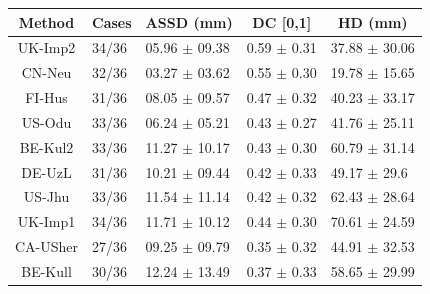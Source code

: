 \documentclass[11pt]{article}
\begin{document}
\begin{table}[]
	\label{siss results}
	\centering
	\begin{tabular}{cllll}
		\textbf{Method} & \multicolumn{1}{c}{\textbf{Cases}} & \multicolumn{1}{c}{\textbf{ASSD (mm)}} & \multicolumn{1}{c}{\textbf{DC {[}0,1{]}}} & \multicolumn{1}{c}{\textbf{HD (mm)}} \\ \hline
		UK-Imp2         & 34/36                              & 05.96 $\pm$ 09.38                         & 0.59 $\pm$ 0.31                              & 37.88 $\pm$ 30.06                       \\ \hline
		CN-Neu          & 32/36                              & 03.27 $\pm$ 03.62                         & 0.55 $\pm$ 0.30                              & 19.78 $\pm$ 15.65                       \\ \hline
		FI-Hus          & 31/36                              & 08.05 $\pm$ 09.57                         & 0.47 $\pm$ 0.32                              & 40.23 $\pm$ 33.17                       \\ \hline
		US-Odu          & 33/36                              & 06.24 $\pm$ 05.21                         & 0.43 $\pm$ 0.27                              & 41.76 $\pm$ 25.11                       \\ \hline
		BE-Kul2         & 33/36                              & 11.27 $\pm$ 10.17                         & 0.43 $\pm$ 0.30                              & 60.79 $\pm$ 31.14                       \\ \hline
		DE-UzL          & 31/36                              & 10.21 $\pm$ 09.44                         & 0.42 $\pm$ 0.33                              & 49.17 $\pm$ 29.6                        \\ \hline
		US-Jhu          & 33/36                              & 11.54 $\pm$ 11.14                         & 0.42 $\pm$ 0.32                              & 62.43 $\pm$ 28.64                       \\ \hline
		UK-Imp1         & 34/36                              & 11.71 $\pm$ 10.12                         & 0.44 $\pm$ 0.30                              & 70.61 $\pm$ 24.59                       \\ \hline
		CA-USher        & 27/36                              & 09.25 $\pm$ 09.79                         & 0.35 $\pm$ 0.32                              & 44.91 $\pm$ 32.53                       \\ \hline
		BE-Kull         & 30/36                              & 12.24 $\pm$ 13.49                         & 0.37 $\pm$ 0.33                              & 58.65 $\pm$ 29.99                       \\ \hline

\end{tabular}
\end{table}
\end{document}
